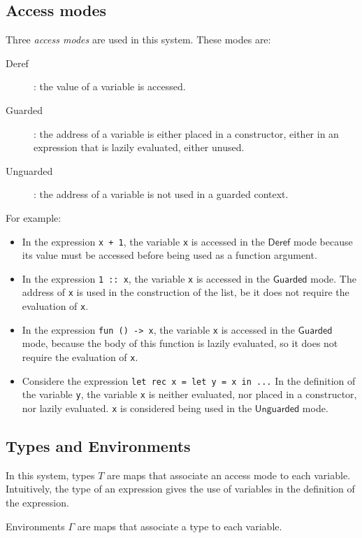 \documentclass{article}
\newcommand{\Deref}{\mathsf{Deref}}
\newcommand{\Unguarded}{\mathsf{Unguarded}}
\newcommand{\Guarded}{\mathsf{Guarded}}
\begin{document}
\subsection{Access modes}
Three \textit{access modes} are used in this system. These modes are:
\begin{description}
  \item[Deref] : the value of a variable is accessed.
  \item[Guarded] : the address of a variable is either placed in a constructor,
    either in an expression that is lazily evaluated, either unused.
  \item[Unguarded] : the address of a variable is not used in a guarded
    context.
\end{description}

For example:
\begin{itemize}
  \item In the expression \lstinline|x + 1|, the variable \lstinline|x| is
    accessed in the $\Deref$ mode because its value must be accessed before
    being used as a function argument.
  \item In the expression \lstinline|1 :: x|, the variable \lstinline|x| is 
    accessed in the $\Guarded$ mode. The address of \lstinline|x| is used in
    the construction of the list, be it does not require the evaluation of
    \lstinline|x|.
  \item In the expression \lstinline|fun () -> x|, the variable \lstinline|x|
    is accessed in the $\Guarded$ mode, because the body of this function is
    lazily evaluated, so it does not require the evaluation of \lstinline|x|.
  \item Considere the expression \lstinline |let rec x = let y = x in ...|
    In the definition of the variable \lstinline|y|, the variable
    \lstinline|x| is neither evaluated, nor placed in a constructor, nor lazily
    evaluated. \lstinline|x| is considered being used in the $\Unguarded$ mode.
\end{itemize}

\subsection{Types and Environments}
In this system, types $T$ are maps that associate an access mode to each
variable.
Intuitively, the type of an expression gives the use of variables in the
definition of the expression.

Environments $\Gamma$ are maps that associate a type to each variable.
\end{document}
